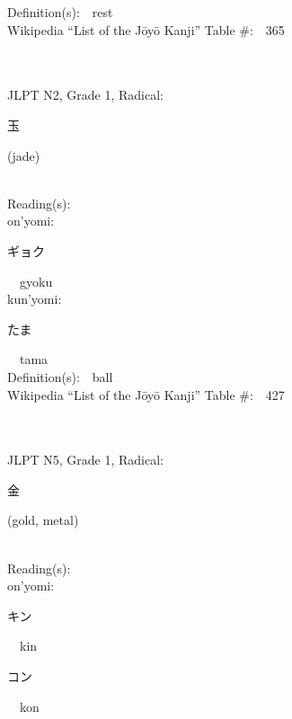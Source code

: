 \begin{multicols}{2}
Definition(s):\ \ rest \\
Wikipedia ``List of the J\=oy\=o Kanji'' Table \#:\ \ 365 \\
\ \ \\
{\fontsize{34pt}{40pt}  }\ \ \\  %
{JLPT N2, Grade 1, Radical:\ \ {\begin{CJK}{UTF8}{min} 玉 \end{CJK}} (jade) } \\
Reading(s):\ \ \\
{\hspace*{1em}}on'yomi:\ \ \\
{\hspace*{2em}}{\begin{CJK}{UTF8}{min} ギョク \end{CJK}}\ \ gyoku\ \ \\
{\hspace*{1em}}kun'yomi:\ \ \\
{\hspace*{2em}}{\begin{CJK}{UTF8}{min} たま \end{CJK}}\ \ tama\ \ \\
Definition(s):\ \ ball \\
Wikipedia ``List of the J\=oy\=o Kanji'' Table \#:\ \ 427 \\
\ \ \\
{\fontsize{34pt}{40pt}  }\ \ \\  %
{JLPT N5, Grade 1, Radical:\ \ {\begin{CJK}{UTF8}{min} 金 \end{CJK}} (gold, metal) } \\
Reading(s):\ \ \\
{\hspace*{1em}}on'yomi:\ \ \\
{\hspace*{2em}}{\begin{CJK}{UTF8}{min} キン \end{CJK}}\ \ kin\ \ \\
{\hspace*{2em}}{\begin{CJK}{UTF8}{min} コン \end{CJK}}\ \ kon\ \ \\

\end{multicols}
